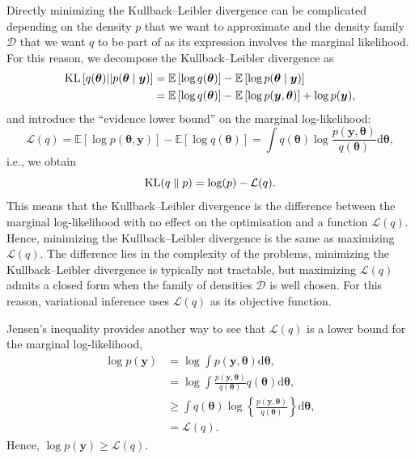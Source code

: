 \documentclass[a4paper, 11pt]{report}
\numberwithin{equation}{chapter}
\DeclareMathOperator*{\KL}{{\rm KL}}
\begin{document}
Directly minimizing the Kullback--Leibler divergence can be complicated depending on the density $p$ that we want to approximate and the density family $\mathcal{D}$ that we want $q$ to be part of as its expression involves the marginal likelihood. For this reason, we decompose the Kullback--Leibler divergence as
\begin{align*}
\KL\left[q(\boldsymbol{\theta})||p(\boldsymbol{\theta}\mid \boldsymbol{y})\right] &= \mathbb{E}\left[\log q(\boldsymbol{\theta})\right] - \mathbb{E}\left[\log p(\boldsymbol{\theta}\mid \boldsymbol{y})\right]\\
&= \mathbb{E}\left[\log q(\boldsymbol{\theta})\right] - \mathbb{E}\left[\log p(\boldsymbol{y},\boldsymbol{\theta})\right] + \log p(\boldsymbol{y}),
\end{align*}
and introduce the ``evidence lower bound'' on the marginal log-likelihood:
\begin{equation*}
\mathcal{L}(q) = \mathbb{E}\left[\log p(\boldsymbol{\theta},\boldsymbol{y})\right] - \mathbb{E}\left[\log q(\boldsymbol{\theta})\right] =\int q(\boldsymbol{\theta})\log\frac{p(\boldsymbol{y},\boldsymbol{\theta})}{q(\boldsymbol{\theta})}\mathrm{d}\boldsymbol{\theta},
\end{equation*}
i.e., we obtain
\begin{equation*}
\KL(q\parallel p) = \log(p) - \mathcal{L}(q).
\end{equation*}
This means that the Kullback--Leibler divergence is the difference between the marginal log-likelihood with no effect on the optimisation and a function $\mathcal{L}(q)$. Hence, minimizing the Kullback--Leibler divergence is the same as maximizing $\mathcal{L}(q)$. The difference lies in the complexity of the problems, minimizing the Kullback--Leibler divergence is typically not tractable, but maximizing $\mathcal{L}(q)$ admits a closed form when the family of densities $\mathcal{D}$ is well chosen. For this reason, variational inference uses $\mathcal{L}(q)$ as its objective function.

Jensen's inequality provides another way to see that $\mathcal{L}(q)$ is a lower bound for the marginal log-likelihood,
\begin{align*}
\log p(\boldsymbol{y}) &= \log \int p(\boldsymbol{y}, \boldsymbol{\theta}) \mathrm{d}\boldsymbol{\theta},\\
&= \log \int \frac{p(\boldsymbol{y}, \boldsymbol{\theta})}{q(\boldsymbol{\theta})}q(\boldsymbol{\theta})\mathrm{d}\boldsymbol{\theta}
,\\
&\geq \int q(\boldsymbol{\theta}) \log \left\lbrace \frac{p(\boldsymbol{y}, \boldsymbol{\theta})}{q(\boldsymbol{\theta})} \right\rbrace \mathrm{d}\boldsymbol{\theta},\\
&= \mathcal{L}(q).
\end{align*}
Hence, $\log p(\boldsymbol{y}) \geq \mathcal{L}(q)$.
\end{document}
